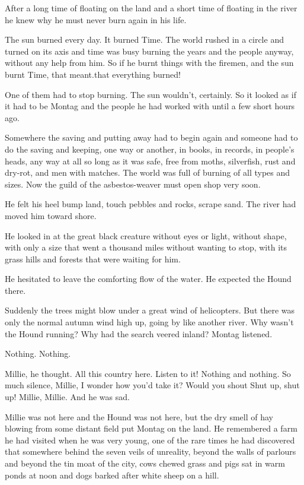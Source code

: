\documentclass[11pt,openany]{book}
\begin{document}
After a long time of floating on the land and a short time of floating in the river he knew why he must never burn again in his life.

The sun burned every day. It burned Time. The world rushed in a circle and turned on its axis and time was busy burning the years and the people anyway, without any help from him. So if he burnt things with the firemen, and the sun burnt Time, that meant.that everything burned!

One of them had to stop burning. The sun wouldn't, certainly. So it looked as if it had to be Montag and the people he had worked with until a few short hours ago.

Somewhere the saving and putting away had to begin again and someone had to do the saving and keeping, one way or another, in books, in records, in people's heads, any way at all so long as it was safe, free from moths, silverfish, rust and dry-rot, and men with matches. The world was full of burning of all types and sizes. Now the guild of the asbestos-weaver must open shop very soon.

He felt his heel bump land, touch pebbles and rocks, scrape sand. The river had moved him toward shore.

He looked in at the great black creature without eyes or light, without shape, with only a size that went a thousand miles without wanting to stop, with its grass hills and forests that were waiting for him.

He hesitated to leave the comforting flow of the water. He expected the Hound there.

Suddenly the trees might blow under a great wind of helicopters. But there was only the normal autumn wind high up, going by like another river. Why wasn't the Hound running? Why had the search veered inland? Montag listened.

Nothing. Nothing.

Millie, he thought. All this country here. Listen to it! Nothing and nothing. So much silence, Millie, I wonder how you'd take it? Would you shout Shut up, shut up! Millie, Millie. And he was sad.

Millie was not here and the Hound was not here, but the dry smell of hay blowing from some distant field put Montag on the land. He remembered a farm he had visited when he was very young, one of the rare times he had discovered that somewhere behind the seven veils of unreality, beyond the walls of parlours and beyond the tin moat of the city, cows chewed grass and pigs sat in warm ponds at noon and dogs barked after white sheep on a hill.
\end{document}
